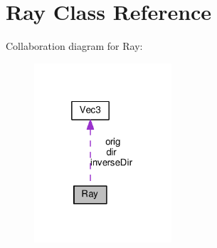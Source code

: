 \hypertarget{class_ray}{}\section{Ray Class Reference}
\label{class_ray}


Collaboration diagram for Ray\+:
\nopagebreak
\begin{figure}[H]
\begin{center}
\leavevmode
\includegraphics[width=145pt]{class_ray__coll__graph}
\end{center}
\end{figure}
